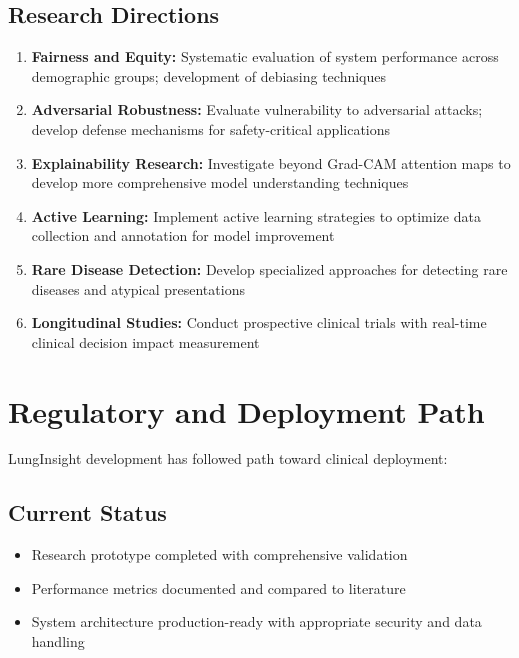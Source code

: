 {\subsection{Research Directions}

\begin{enumerate}
    \item \textbf{Fairness and Equity:} Systematic evaluation of system performance across demographic groups; development of debiasing techniques
    
    \item \textbf{Adversarial Robustness:} Evaluate vulnerability to adversarial attacks; develop defense mechanisms for safety-critical applications
    
    \item \textbf{Explainability Research:} Investigate beyond Grad-CAM attention maps to develop more comprehensive model understanding techniques
    
    \item \textbf{Active Learning:} Implement active learning strategies to optimize data collection and annotation for model improvement
    
    \item \textbf{Rare Disease Detection:} Develop specialized approaches for detecting rare diseases and atypical presentations
    
    \item \textbf{Longitudinal Studies:} Conduct prospective clinical trials with real-time clinical decision impact measurement
\end{enumerate}

\section{Regulatory and Deployment Path}

LungInsight development has followed path toward clinical deployment:

\subsection{Current Status}

\begin{itemize}
    \item Research prototype completed with comprehensive validation
    \item Performance metrics documented and compared to literature
    \item System architecture production-ready with appropriate security and data handling
\end{itemize}

}
